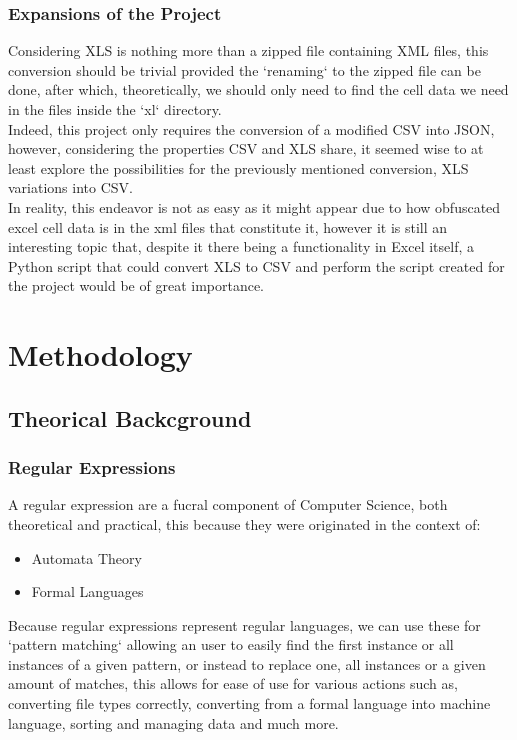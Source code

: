 \documentclass[11pt,a4paper,times]{report}
\begin{document}
\subsubsection*{Expansions of the Project}Considering XLS is nothing more
than a zipped file containing XML files, this conversion should be trivial provided
the `renaming` to the zipped file can be done, after which, theoretically,
we should only need to find the cell data we need in the files inside the `xl` directory.
\\
Indeed, this project only requires the conversion of a modified CSV into JSON, however, considering
the properties CSV and XLS share, it seemed wise to at least explore the possibilities for the previously
mentioned conversion, XLS variations into CSV.
\\
In reality, this endeavor is not as easy as it might appear due to how obfuscated excel cell data is
in the xml files that constitute it, however it is still an interesting topic that, despite it there being a
functionality in Excel itself, a Python script that could convert XLS to CSV and
perform the script created for the project would be of great importance.

\section{Methodology} \label{methodology}
\subsection{Theorical Backcground} \label{theory}
\subsubsection*{Regular Expressions}A regular expression are a fucral
component of Computer Science, both theoretical and practical, this because they
were originated in the context of:
\begin{itemize}
    \item{Automata Theory}
    \item{Formal Languages}
\end{itemize}
Because regular expressions represent regular languages, we can use these for `pattern matching`
allowing an user to easily find the first instance or all instances of a given pattern, or instead
to replace one, all instances or a given amount of matches, this allows for ease of use for various actions
such as, converting file types correctly, converting from a formal language into machine language, sorting
and managing data and much more.
\end{document}

